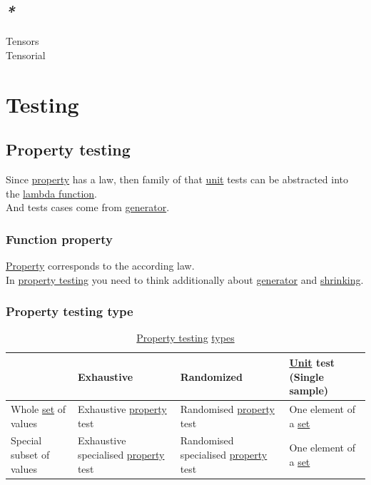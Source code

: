 \documentclass[a4paper,14pt,oneside]{book}
\begin{document}
\section{\emph{*}}
\label{sec:orgdc2cd6d}

\label{orgac09a0b}Tensors\\
\label{org9f183d4}Tensorial\\

\chapter{\label{orge29c6dd}Testing}
\label{sec:org56c89c9}
\section{\label{org94c5df3}Property testing}
\label{sec:org97d0ccc}
Since \hyperref[org49b84ac]{property} has a law, then family of that \hyperref[orgf09cc4a]{unit} tests can be abstracted into the \hyperref[org9bf1ac3]{lambda function}.\\
And tests cases come from \hyperref[org0949f7f]{generator}.\\

\subsection{\label{org57bfb7e}Function property}
\label{sec:org75e5e08}
\hyperref[org49b84ac]{Property} corresponds to the according law.\\
In \hyperref[org94c5df3]{property testing} you need to think additionally about \hyperref[org0949f7f]{generator} and \hyperref[orgb5a3776]{shrinking}.\\

\subsection{\label{org07c7e22}Property testing type}
\label{sec:org26fbea9}

\begin{table}[htbp]
\caption{\label{tab--property-testing-type}\hyperref[org94c5df3]{Property testing} \hyperref[org47bd1c4]{types}}
\centering
\begin{tabular}{llll}
\hline
 & Exhaustive & Randomized & \hyperref[orgf09cc4a]{Unit} test (Single sample)\\
\hline
Whole \hyperref[orgc6fbcf3]{set} of values & Exhaustive \hyperref[org49b84ac]{property} test & Randomised \hyperref[org49b84ac]{property} test & One element of a \hyperref[orgc6fbcf3]{set}\\
Special subset of values & Exhaustive specialised \hyperref[org49b84ac]{property} test & Randomised specialised \hyperref[org49b84ac]{property} test & One element of a \hyperref[orgc6fbcf3]{set}\\
\hline
\end{tabular}
\end{table}
\end{document}
